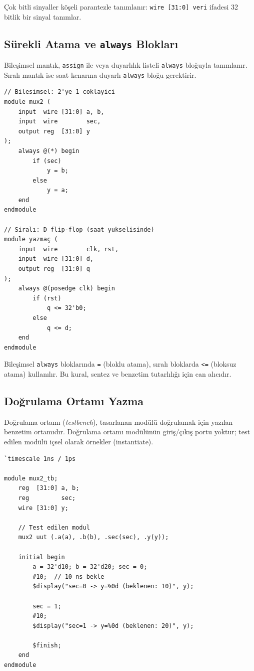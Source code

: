 Çok bitli sinyaller köşeli parantezle tanımlanır: \texttt{wire [31:0] veri} ifadesi 32 bitlik bir sinyal tanımlar.

\subsection{Sürekli Atama ve \texttt{always} Blokları}
\label{sec:ekd-always}

Bileşimsel mantık, \texttt{assign} ile veya duyarlılık listeli \texttt{always} bloğuyla tanımlanır. Sıralı mantık ise saat kenarına duyarlı \texttt{always} bloğu gerektirir.

\begin{lstlisting}[style=verilog, caption={Bileşimsel ve sıralı mantık örnekleri}, label={lst:ekd-always}]
// Bilesimsel: 2'ye 1 coklayici
module mux2 (
    input  wire [31:0] a, b,
    input  wire        sec,
    output reg  [31:0] y
);
    always @(*) begin
        if (sec)
            y = b;
        else
            y = a;
    end
endmodule

// Siralı: D flip-flop (saat yukselisinde)
module yazmaç (
    input  wire        clk, rst,
    input  wire [31:0] d,
    output reg  [31:0] q
);
    always @(posedge clk) begin
        if (rst)
            q <= 32'b0;
        else
            q <= d;
    end
endmodule
\end{lstlisting}

\begin{bilginot}
Bileşimsel \texttt{always} bloklarında \texttt{=} (bloklu atama), sıralı bloklarda \texttt{<=} (bloksuz atama) kullanılır. Bu kural, sentez ve benzetim tutarlılığı için can alıcıdır.
\end{bilginot}

\subsection{Doğrulama Ortamı Yazma}
\label{sec:ekd-testbench}

Doğrulama ortamı (\emph{testbench}), tasarlanan modülü doğrulamak için yazılan benzetim ortamıdır. Doğrulama ortamı modülünün giriş/çıkış portu yoktur; test edilen modülü içsel olarak örnekler (instantiate).

\begin{lstlisting}[style=verilog, caption={2'ye 1 çoklayıcı doğrulama ortamı örneği}, label={lst:ekd-testbench}]
`timescale 1ns / 1ps

module mux2_tb;
    reg  [31:0] a, b;
    reg         sec;
    wire [31:0] y;

    // Test edilen modul
    mux2 uut (.a(a), .b(b), .sec(sec), .y(y));

    initial begin
        a = 32'd10; b = 32'd20; sec = 0;
        #10;  // 10 ns bekle
        $display("sec=0 -> y=%0d (beklenen: 10)", y);

        sec = 1;
        #10;
        $display("sec=1 -> y=%0d (beklenen: 20)", y);

        $finish;
    end
endmodule
\end{lstlisting}

